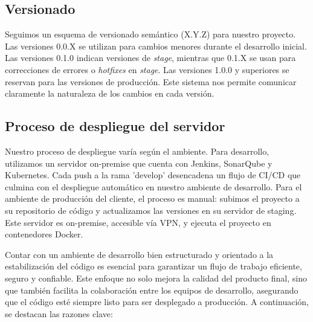 \subsection{Versionado}
Seguimos un esquema de versionado semántico (X.Y.Z) para nuestro proyecto. Las versiones 0.0.X se utilizan para cambios menores durante 
el desarrollo inicial. Las versiones 0.1.0 indican versiones de \textit{stage}, mientras que 0.1.X se usan para correcciones de errores o \textit{hotfixes} 
en \textit{stage}. Las versiones 1.0.0 y superiores se reservan para las versiones de producción. Este sistema nos permite comunicar claramente la 
naturaleza de los cambios en cada versión.

\subsection{Proceso de despliegue del servidor}
Nuestro proceso de despliegue varía según el ambiente. Para desarrollo, utilizamos un servidor on-premise que cuenta con Jenkins, SonarQube y Kubernetes. 
Cada push a la rama 'develop' desencadena un flujo de CI/CD que culmina con el despliegue automático en nuestro ambiente de desarrollo. Para el ambiente de 
producción del cliente, el proceso es manual: subimos el proyecto a su repositorio de código y actualizamos las versiones en su servidor de staging. 
Este servidor es on-premise, accesible vía VPN, y ejecuta el proyecto en contenedores Docker.

Contar con un ambiente de desarrollo bien estructurado y orientado a la estabilización del código es esencial para garantizar un flujo de trabajo eficiente, 
seguro y confiable. Este enfoque no solo mejora la calidad del producto final, sino que también facilita la colaboración entre los equipos de desarrollo, 
asegurando que el código esté siempre listo para ser desplegado a producción. A continuación, se destacan las razones clave:

